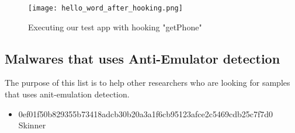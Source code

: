 \documentclass[../main.tex]{subfile}
\begin{document}
		\begin{figure}
			\texttt{[image: hello\_word\_after\_hooking.png]}
			\caption{Executing our test app with hooking  "getPhone"}
			\label{fig:hooking_execute}			
		\end{figure}	
	
	
	\subsection{Malwares that uses Anti-Emulator detection}
	The purpose of this list is to help other researchers who are looking for samples that uses anit-emulation detection.
	\begin{itemize}
		\item 0ef01f50b829355b73418adcb30b20a3a1f6cb95123afce2c5469cdb25c7f7d0 Skinner
	\end{itemize}
	
			
\end{document}
